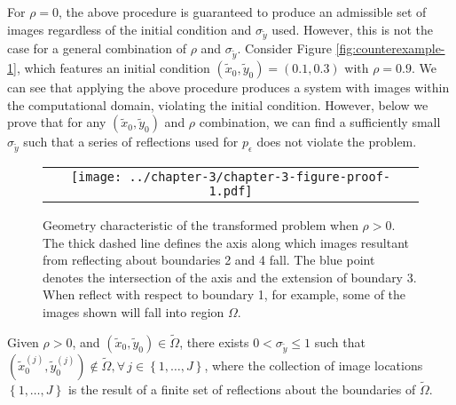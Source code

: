 For $\rho=0$, the above procedure is guaranteed to produce an
admissible set of images regardless of the initial condition and
$\sigma_{\tilde{y}}$ used. However, this is not the case for a general
combination of $\rho$ and $\sigma_{\tilde{y}}$. Consider Figure
\ref{fig:counterexample-1}, which features an initial condition
$(\tilde{x}_0, \tilde{y}_0)=(0.1,0.3)$ with $\rho=0.9$. We can see
that applying the above procedure produces a system with images within
the computational domain, violating the initial condition.  However,
below we prove that for any $(\tilde{x}_0, \tilde{y}_0)$ and $\rho$
combination, we can find a sufficiently small $\sigma_{\tilde{y}}$
such that a series of reflections used for $p_\epsilon$ does not
violate the problem.

\begin{figure}
  \begin{tabular}{c}
    \begin{minipage}{0.99\textwidth}
      \centering
      \texttt{[image: ../chapter-3/chapter-3-figure-proof-1.pdf]}
      \caption{Geometry characteristic of the transformed problem when
        $\rho>0$. The thick dashed line defines the axis along which
        images resultant from reflecting about boundaries 2 and 4
        fall. The blue point denotes the intersection of the axis and
        the extension of boundary 3. When reflect with respect to
        boundary 1, for example, some of the images shown will fall
        into region $\Omega$.}
      \label{fig:proof-1}
    \end{minipage}
  \end{tabular}
\end{figure}

\begin{lemma}
  Given $\rho > 0$, and
  $(\tilde{x}_0, \tilde{y}_0) \in \tilde{\Omega}$, there exists
  $0 < \sigma_{\tilde{y}} \leq 1$ such that
  $(\tilde{x}_0^{(j)}, \tilde{y}_0^{(j)}) \notin \tilde{\Omega},
  \forall \, j\in \left\{1, \ldots, J\right\}$, where the collection
  of image locations $\left\{1, \ldots, J\right\}$ is the result of a
  finite set of reflections about the boundaries of $\tilde{\Omega}$.
\end{lemma}

